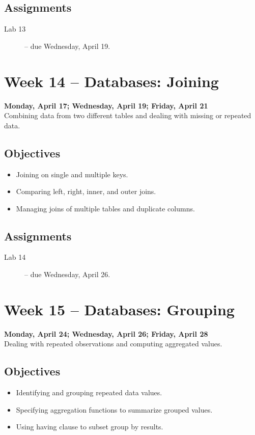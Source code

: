\documentclass[10pt]{memoir}
\begin{document}
    \subsection{Assignments}
    \begin{description}
        \item[Lab 13 ] -- due Wednesday, April 19.
    \end{description}
    
\section{Week 14 -- Databases: Joining}
\textcolor{CUGold}{\textbf{Monday, April 17; Wednesday, April 19; Friday, April 21}}\\
Combining data from two different tables and dealing with missing or repeated data. 

    \subsection{Objectives}
    \begin{itemize}
        \item Joining on single and multiple keys.
        \item Comparing left, right, inner, and outer joins.
        \item Managing joins of multiple tables and duplicate columns.
    \end{itemize}

    \subsection{Assignments}
    \begin{description}
        \item[Lab 14 ] -- due Wednesday, April 26.
    \end{description}
    
\section{Week 15 -- Databases: Grouping}
\textcolor{CUGold}{\textbf{Monday, April 24; Wednesday, April 26; Friday, April 28}}\\
Dealing with repeated observations and computing aggregated values.

    \subsection{Objectives}
    \begin{itemize}
        \item Identifying and grouping repeated data values.
        \item Specifying aggregation functions to summarize grouped values.
        \item Using having clause to subset group by results.
    \end{itemize}
\end{document}
